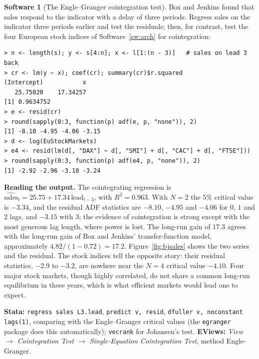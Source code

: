 \documentclass[11pt,a4paper]{article}
\numberwithin{equation}{section}
\theoremstyle{definition}
\newtheorem{software}[thm]{Software}
\begin{document}
\begin{software}[The Engle--Granger cointegration test]
\label{sw:eg}
Box and Jenkins found that sales respond to the indicator with a delay of three periods. Regress sales on the indicator three periods earlier
and test the residuals; then, for contrast, test the four European stock indices of Software~\ref{sw:arch} for cointegration:
{\small\begin{verbatim}
> n <- length(s); y <- s[4:n]; x <- l[1:(n - 3)]   # sales on lead 3 back
> cr <- lm(y ~ x); coef(cr); summary(cr)$r.squared
(Intercept)           x 
   25.75020    17.34257 
[1] 0.9634752
> e <- resid(cr)
> round(sapply(0:3, function(p) adf(e, p, "none")), 2)
[1] -8.10 -4.95 -4.06 -3.15
> d <- log(EuStockMarkets)
> e4 <- resid(lm(d[, "DAX"] ~ d[, "SMI"] + d[, "CAC"] + d[, "FTSE"]))
> round(sapply(0:3, function(p) adf(e4, p, "none")), 2)
[1] -2.92 -2.96 -3.10 -3.24
\end{verbatim}}
\textbf{Reading the output.} The cointegrating regression is $\widehat{\text{sales}}_t = 25.75 + 17.34\,\text{lead}_{t-3}$, with $R^2 = 0.963$. With $N = 2$ the $5\%$ critical value is $-3.34$,
and the residual ADF statistics are $-8.10$, $-4.95$ and $-4.06$ for $0$, $1$ and $2$ lags, and $-3.15$ with $3$; the evidence of cointegration is strong except with the most
generous lag length, where power is lost. The long-run gain of $17.3$ agrees with the long-run gain of Box and Jenkins' transfer-function model, approximately $4.82/(1 - 0.72) = 17.2$.
Figure~\ref{fig:bjsales} shows the two series and the residual. The stock indices tell the opposite story: their residual statistics, $-2.9$ to $-3.2$, are
nowhere near the $N = 4$ critical value $-4.10$. Four major stock markets, though highly correlated, do not share a common long-run equilibrium in these
years, which is what efficient markets would lead one to expect.

\textbf{Stata:} \texttt{regress sales L3.lead}, \texttt{predict v, resid}, \texttt{dfuller v, noconstant lags(1)}, comparing with the Engle--Granger critical values (the
\texttt{egranger} package does this automatically); \texttt{vecrank} for Johansen's test. \textbf{EViews:} \emph{View $\to$ Cointegration Test $\to$ Single-Equation
Cointegration Test}, method Engle-Granger.
\end{software}
\end{document}
